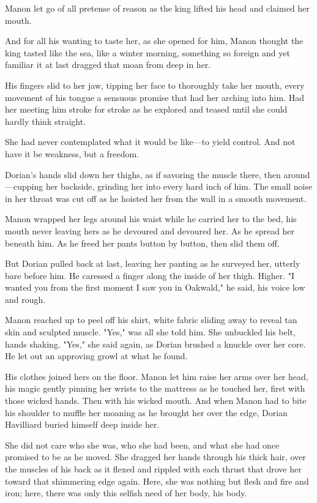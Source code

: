 Manon let go of all pretense of reason as the king lifted his head and claimed her mouth.

And for all his wanting to taste her, as she opened for him, Manon thought the king tasted like the sea, like a winter morning, something so foreign and yet familiar it at last dragged that moan from deep in her.

His fingers slid to her jaw, tipping her face to thoroughly take her mouth, every movement of his tongue a sensuous promise that had her arching into him. Had her meeting him stroke for stroke as he explored and teased until she could hardly think straight.

She had never contemplated what it would be like---to yield control. And not have it be weakness, but a freedom.

Dorian's hands slid down her thighs, as if savoring the muscle there, then around---cupping her backside, grinding her into every hard inch of him. The small noise in her throat was cut off as he hoisted her from the wall in a smooth movement.

Manon wrapped her legs around his waist while he carried her to the bed, his mouth never leaving hers as he devoured and devoured her. As he spread her beneath him. As he freed her pants button by button, then slid them off.

But Dorian pulled back at last, leaving her panting as he surveyed her, utterly bare before him. He caressed a finger along the inside of her thigh. Higher. "I wanted you from the first moment I saw you in Oakwald," he said, his voice low and rough.

Manon reached up to peel off his shirt, white fabric sliding away to reveal tan skin and sculpted muscle. "Yes," was all she told him. She unbuckled his belt, hands shaking. "Yes," she said again, as Dorian brushed a knuckle over her core. He let out an approving growl at what he found.

His clothes joined hers on the floor. Manon let him raise her arms over her head, his magic gently pinning her wrists to the mattress as he touched her, first with those wicked hands. Then with his wicked mouth. And when Manon had to bite his shoulder to muffle her moaning as he brought her over the edge, Dorian Havilliard buried himself deep inside her.

She did not care who she was, who she had been, and what she had once promised to be as he moved. She dragged her hands through his thick hair, over the muscles of his back as it flexed and rippled with each thrust that drove her toward that shimmering edge again. Here, she was nothing but flesh and fire and iron; here, there was only this selfish need of her body, his body.

